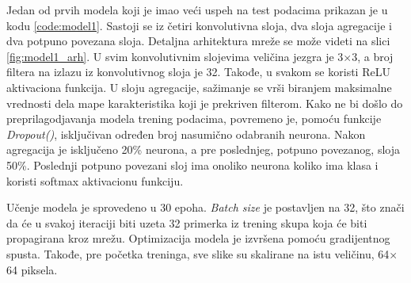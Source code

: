 \documentclass[a4paper]{article}
\begin{document}
Jedan od prvih modela koji je imao veći uspeh na test podacima prikazan je u kodu \ref{code:model1}. Sastoji se iz četiri konvolutivna sloja, dva sloja agregacije i dva potpuno povezana sloja. Detaljna arhitektura mreže se može videti na slici \ref{fig:model1_arh}. U svim konvolutivnim slojevima veličina jezgra je 3$\times$3, a broj filtera na izlazu iz konvolutivnog sloja je 32. Takođe, u svakom se koristi ReLU aktivaciona funkcija. U sloju agregacije, sažimanje se vrši biranjem maksimalne vrednosti dela mape karakteristika koji je prekriven filterom. Kako ne bi došlo do preprilagodjavanja modela trening podacima, povremeno je, pomoću funkcije \textit{Dropout()}, isključivan određen broj nasumično odabranih neurona. Nakon agregacija je isključeno 20\% neurona, a pre poslednjeg, potpuno povezanog, sloja 50\%. Poslednji potpuno povezani sloj ima onoliko neurona koliko ima klasa i koristi softmax aktivacionu funkciju.

Učenje modela je sprovedeno u 30 epoha. \textit{Batch size} je postavljen na 32, što znači da će u svakoj iteraciji biti uzeta 32 primerka iz trening skupa koja će biti propagirana kroz mrežu. Optimizacija modela je izvršena pomoću gradijentnog spusta. Takođe, pre početka treninga, sve slike su skalirane na istu veličinu, 64$\times$64 piksela.
\end{document}

